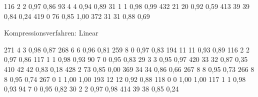 \begin{table}[p]
\begin{datatabular}
     {116} {2} {2} {0,97} {0,86}
     {93} {4} {4} {0,94} {0,89}
     {31} {1} {1} {0,98} {0,99}
     {432} {21} {20} {0,92} {0,59}
     {413} {39} {39} {0,84} {0,24}
     {419} {0} {76} {0,85} {1,00}
     {372} {31} {31} {0,88} {0,69}
  \end{datatabular}
  \caption{Kompressionsverfahren: Linear}\label{tab:datakomplin}
 \end{table}

 \begin{table}[p]
  \centering
  \begin{datatabular}
     {271} {4} {3} {0,98} {0,87}
     {268} {6} {6} {0,96} {0,81}
     {259} {8} {0} {0,97} {0,83}
     {194} {11} {11} {0,93} {0,89}
     {116} {2} {2} {0,97} {0,86}
     {117} {1} {1} {0,98} {0,93}
     {90} {7} {0} {0,95} {0,83}
     {29} {3} {3} {0,95} {0,97}
     {420} {33} {32} {0,87} {0,35}
     {410} {42} {42} {0,83} {0,18}
     {428} {2} {73} {0,85} {0,00}
     {369} {34} {34} {0,86} {0,66}
     {267} {8} {8} {0,95} {0,73}
     {266} {8} {8} {0,95} {0,74}
     {267} {0} {1} {1,00} {1,00}
     {193} {12} {12} {0,92} {0,88}
     {118} {0} {0} {1,00} {1,00}
     {117} {1} {1} {0,98} {0,93}
     {94} {7} {0} {0,95} {0,82}
     {30} {2} {2} {0,97} {0,98}
     {414} {39} {38} {0,85} {0,24}

\end{datatabular}
\end{table}
